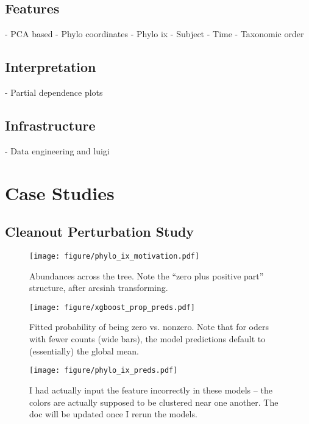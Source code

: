 \documentclass{article}
\begin{document}
\subsection{Features}
- PCA based
- Phylo coordinates
- Phylo ix
- Subject
- Time
- Taxonomic order

\subsection{Interpretation}
- Partial dependence plots

\subsection{Infrastructure}
- Data engineering and luigi

\section{Case Studies}

\subsection{Cleanout Perturbation Study}

\begin{figure}[ht]
  \centering
  \texttt{[image: figure/phylo\_ix\_motivation.pdf]}
  \caption{Abundances across the tree. Note the ``zero plus positive part'' structure, after arcsinh transforming. \label{fig:label} }
\end{figure}


\begin{figure}[ht]
  \centering
  \texttt{[image: figure/xgboost\_prop\_preds.pdf]}
  \caption{Fitted probability of being zero vs. nonzero. Note that for oders with fewer counts (wide bars), the model predictions default to (essentially) the global mean.\label{fig:label} }
\end{figure}

\begin{figure}[ht]
  \centering
  \texttt{[image: figure/phylo\_ix\_preds.pdf]}
  \caption{I had actually input the feature incorrectly in these models -- the colors are actually supposed to be clustered near one another. The doc will be updated once I rerun the models. \label{fig:label} }
\end{figure}



\end{document}
